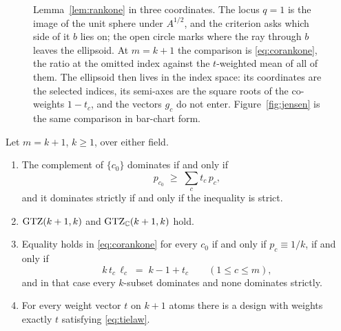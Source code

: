 \begin{figure}[ht]
  \centering
  
  \caption{Lemma~\ref{lem:rankone} in three coordinates.  The locus $q=1$ is the
  image of the unit sphere under $A^{1/2}$, and the criterion asks which side of
  it $b$ lies on; the open circle marks where the ray through $b$ leaves the
  ellipsoid.  At $m=k+1$ the comparison is \eqref{eq:corankone}, the ratio at the
  omitted index against the $t$-weighted mean of all of them.  The ellipsoid then
  lives in the index space: its coordinates are the selected indices, its
  semi-axes are the square roots of the co-weights $1-t_c$, and the vectors $g_c$
  do not enter.  Figure~\ref{fig:jensen} is the same comparison in bar-chart
  form.}
  \label{fig:rankoneball}
\end{figure}

\begin{theorem}[Lean]\label{thm:corankone}
Let $m=k+1$, $k\ge1$, over either field.
\begin{enumerate}
\item[(i)] The complement of $\{c_0\}$ dominates if and only if
\begin{equation}\label{eq:corankone}
  p_{c_0}\;\ge\;\sum_{c} t_c\,p_c ,
\end{equation}
and it dominates strictly if and only if the inequality is strict.
\item[(ii)] $\mathrm{GTZ}(k+1,k)$ and $\mathrm{GTZ}_{\mathbb{C}}(k+1,k)$ hold.
\item[(iii)] Equality holds in \eqref{eq:corankone} for every $c_0$ if
and only if $p_c\equiv1/k$, if and only if
\begin{equation}\label{eq:tielaw}
  k\,t_c\,\ell_c \;=\; k-1+t_c \qquad (1\le c\le m),
\end{equation}
and in that case every $k$-subset dominates and none dominates strictly.
\item[(iv)] For every weight vector $t$ on $k+1$ atoms there is a design
with weights exactly $t$ satisfying \eqref{eq:tielaw}.
\end{enumerate}
\end{theorem}

